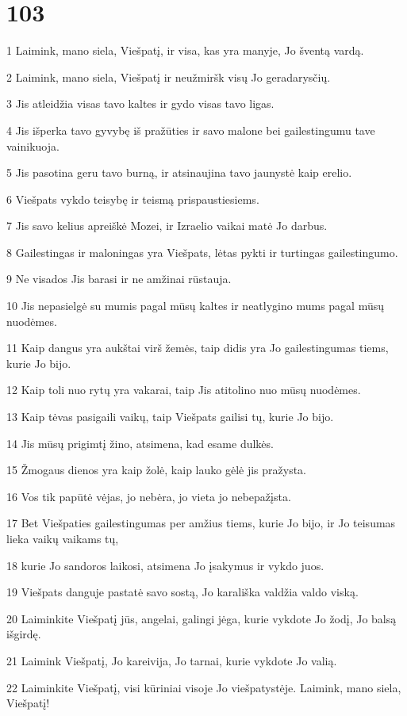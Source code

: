 \chapter{103}


\par 1 Laimink, mano siela, Viešpatį, ir visa, kas yra manyje, Jo šventą vardą. 
\par 2 Laimink, mano siela, Viešpatį ir neužmiršk visų Jo geradarysčių. 
\par 3 Jis atleidžia visas tavo kaltes ir gydo visas tavo ligas. 
\par 4 Jis išperka tavo gyvybę iš pražūties ir savo malone bei gailestingumu tave vainikuoja. 
\par 5 Jis pasotina geru tavo burną, ir atsinaujina tavo jaunystė kaip erelio. 
\par 6 Viešpats vykdo teisybę ir teismą prispaustiesiems. 
\par 7 Jis savo kelius apreiškė Mozei, ir Izraelio vaikai matė Jo darbus. 
\par 8 Gailestingas ir maloningas yra Viešpats, lėtas pykti ir turtingas gailestingumo. 
\par 9 Ne visados Jis barasi ir ne amžinai rūstauja. 
\par 10 Jis nepasielgė su mumis pagal mūsų kaltes ir neatlygino mums pagal mūsų nuodėmes. 
\par 11 Kaip dangus yra aukštai virš žemės, taip didis yra Jo gailestingumas tiems, kurie Jo bijo. 
\par 12 Kaip toli nuo rytų yra vakarai, taip Jis atitolino nuo mūsų nuodėmes. 
\par 13 Kaip tėvas pasigaili vaikų, taip Viešpats gailisi tų, kurie Jo bijo. 
\par 14 Jis mūsų prigimtį žino, atsimena, kad esame dulkės. 
\par 15 Žmogaus dienos yra kaip žolė, kaip lauko gėlė jis pražysta. 
\par 16 Vos tik papūtė vėjas, jo nebėra, jo vieta jo nebepažįsta. 
\par 17 Bet Viešpaties gailestingumas per amžius tiems, kurie Jo bijo, ir Jo teisumas lieka vaikų vaikams tų, 
\par 18 kurie Jo sandoros laikosi, atsimena Jo įsakymus ir vykdo juos. 
\par 19 Viešpats danguje pastatė savo sostą, Jo karališka valdžia valdo viską. 
\par 20 Laiminkite Viešpatį jūs, angelai, galingi jėga, kurie vykdote Jo žodį, Jo balsą išgirdę. 
\par 21 Laimink Viešpatį, Jo kareivija, Jo tarnai, kurie vykdote Jo valią. 
\par 22 Laiminkite Viešpatį, visi kūriniai visoje Jo viešpatystėje. Laimink, mano siela, Viešpatį!


